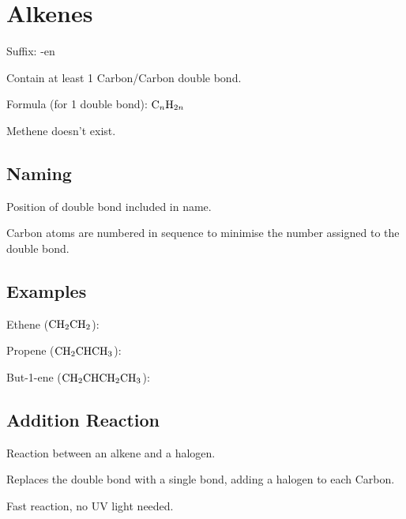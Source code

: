 \documentclass[a4paper,11pt]{article}
\begin{document}
\section{Alkenes}

Suffix: -en

Contain at least 1 Carbon/Carbon double bond.

Formula (for 1 double bond): $\ce{C_{n}H_{2n}}$

Methene doesn't exist.


\subsection{Naming}

Position of double bond included in name.

Carbon atoms are numbered in sequence to minimise the number assigned to the
double bond.


\subsection{Examples}

Ethene ($\ce{CH2CH2}$):

\begin{center}
\end{center}

Propene ($\ce{CH2CHCH3}$):

\begin{center}
\end{center}

But-1-ene ($\ce{CH2CHCH2CH3}$):

\begin{center}
\end{center}


\subsection{Addition Reaction}

Reaction between an alkene and a halogen.

Replaces the double bond with a single bond, adding a halogen to each Carbon.

Fast reaction, no UV light needed.
\end{document}
